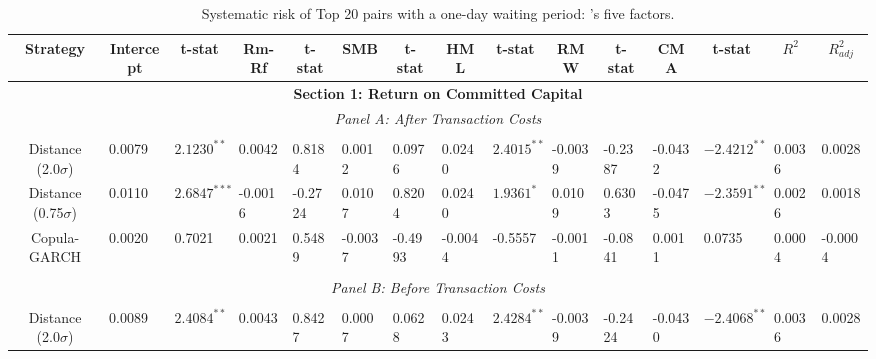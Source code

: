\documentclass[a4paper]{article}
\begin{document}
\begin{sidewaystable}
	\caption{Systematic risk of Top 20 pairs with a one-day waiting period: \citet*{ff15}'s five factors.}
	\begin{threeparttable}[H]
		\centering \scriptsize
		\begin{tabularx}{\textwidth}{@{\extracolsep{\fill}}lllllllllllllll@{}}
			\toprule
			\multicolumn{1}{c}{Strategy} & \multicolumn{1}{c}{Intercept} & \multicolumn{1}{c}{t-stat} & \multicolumn{1}{c}{Rm-Rf} & \multicolumn{1}{c}{t-stat} & \multicolumn{1}{c}{SMB} & \multicolumn{1}{c}{t-stat} & \multicolumn{1}{c}{HML} & \multicolumn{1}{c}{t-stat} & \multicolumn{1}{c}{RMW} & \multicolumn{1}{c}{t-stat} & \multicolumn{1}{c}{CMA} & \multicolumn{1}{c}{t-stat} & \multicolumn{1}{c}{$R^{2}$} & \multicolumn{1}{c}{$R^{2}_{adj}$} \\
			\midrule
			\multicolumn{15}{c}{\textbf{Section 1: Return on Committed Capital}} \\
			\multicolumn{15}{c}{\textit{Panel A: After Transaction Costs}} \\
			\multicolumn{1}{c}{} & \multicolumn{1}{c}{} & \multicolumn{1}{c}{} & \multicolumn{1}{c}{} & \multicolumn{1}{c}{} & \multicolumn{1}{c}{} & \multicolumn{1}{c}{} & \multicolumn{1}{c}{} &       &       &       &       &       &       &  \\
			\multicolumn{1}{c}{Distance (2.0$\sigma$)} & 0.0079 & $2.1230^{**}$ & 0.0042 & 0.8184 & 0.0012 & 0.0976 & 0.0240 & $2.4015^{**}$ & -0.0039 & -0.2387 & -0.0432 & $-2.4212^{**}$ & 0.0036 & 0.0028 \\
			\multicolumn{1}{c}{Distance (0.75$\sigma$)} & 0.0110 & $2.6847^{***}$ & -0.0016 & -0.2724 & 0.0107 & 0.8204 & 0.0240 & $1.9361^{*}$ & 0.0109 & 0.6303 & -0.0475 & $-2.3591^{**}$ & 0.0026 & 0.0018 \\
			\multicolumn{1}{c}{Copula-GARCH} & 0.0020 & 0.7021 & 0.0021 & 0.5489 & -0.0037 & -0.4993 & -0.0044 & -0.5557 & -0.0011 & -0.0841 & 0.0011 & 0.0735 & 0.0004 & -0.0004 \\
			&       &       &       &       &       &       &       &       &       &       &       &       &       &  \\
			\multicolumn{15}{c}{\textit{Panel B: Before Transaction Costs}} \\
			&       &       &       &       &       &       &       &       &       &       &       &       &       &  \\
			\multicolumn{1}{c}{Distance (2.0$\sigma$)} & 0.0089 & $2.4084^{**}$ & 0.0043 & 0.8427 & 0.0007 & 0.0628 & 0.0243 & $2.4284^{**}$ & -0.0039 & -0.2424 & -0.0430 & $-2.4068^{**}$ & 0.0036 & 0.0028 \\

\end{tabularx}
\end{threeparttable}
\end{sidewaystable}
\end{document}
